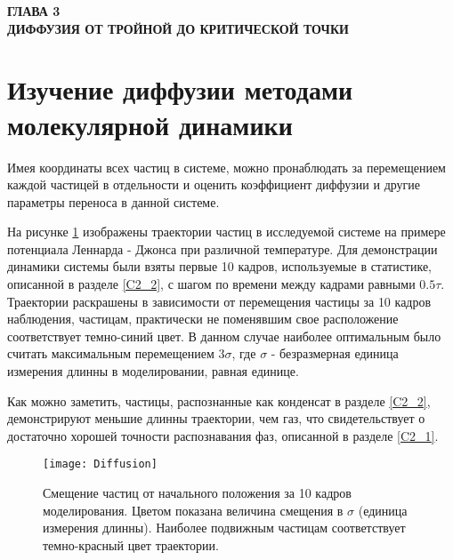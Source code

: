 
\newpage
\begin{center}
\textbf{ГЛАВА 3}\\
\textbf{ДИФФУЗИЯ ОТ ТРОЙНОЙ ДО КРИТИЧЕСКОЙ ТОЧКИ}
\end{center}




\section{Изучение диффузии методами молекулярной динамики}\label{C3_1}

Имея координаты всех частиц в системе, можно пронаблюдать за перемещением каждой частицей в отдельности и оценить коэффициент диффузии и другие параметры переноса в данной системе.

На рисунке \ref{risTreck} изображены траектории частиц в исследуемой системе на примере потенциала Леннарда - Джонса при различной температуре.  Для демонстрации динамики системы были взяты первые 10 кадров, используемые в статистике, описанной в разделе \ref{C2_2}, с шагом по времени между кадрами равными $0.5\tau$. Траектории раскрашены в зависимости от перемещения частицы за 10 кадров наблюдения, частицам, практически не поменявшим свое расположение соответствует темно-синий цвет. В данном случае наиболее оптимальным было считать максимальным перемещением $3\sigma$, где $\sigma$ - безразмерная единица измерения длинны в моделировании, равная единице.

Как можно заметить, частицы, распознанные как конденсат в разделе \ref{C2_2}, демонстрируют меньшие длинны траектории, чем газ, что свидетельствует о достаточно хорошей точности распознавания фаз, описанной в разделе \ref{C2_1}. 

\begin{figure}[h]
\begin{center}
\texttt{[image: Diffusion]}
\caption{Смещение частиц от начального положения за 10 кадров моделирования. Цветом показана величина смещения в $\sigma$ (единица измерения длинны). Наиболее подвижным частицам соответствует темно-красный цвет траектории.}
\label{risTreck}
\end{center}
\end{figure}

